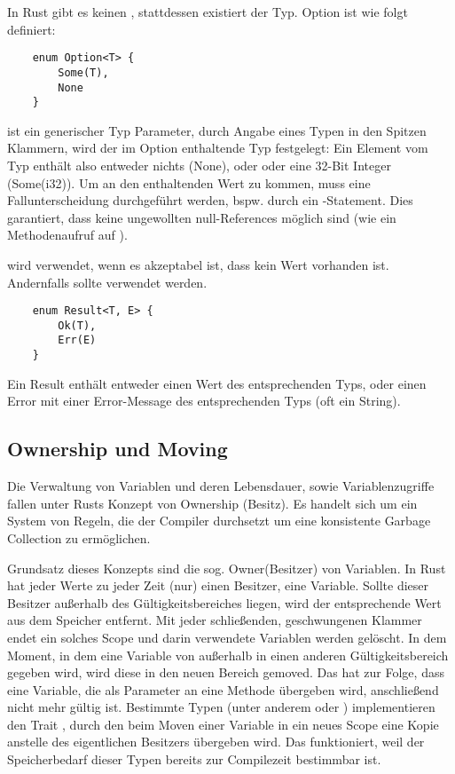 In Rust gibt es keinen , stattdessen existiert der  Typ. Option ist wie folgt definiert:

\begin{verbatim}
    enum Option<T> {
        Some(T),
        None
    }
\end{verbatim}

 ist ein generischer Typ Parameter, durch Angabe eines Typen in den Spitzen Klammern, wird der im Option enthaltende Typ festgelegt:
Ein Element vom Typ  enthält also entweder nichts (None), oder oder eine 32-Bit Integer (Some(i32)). Um an den enthaltenden Wert zu kommen, muss eine Fallunterscheidung durchgeführt werden, bspw. durch ein -Statement. Dies garantiert, dass keine ungewollten null-References möglich sind (wie \zB ein Methodenaufruf auf ).

 wird verwendet, wenn es akzeptabel ist, dass kein Wert vorhanden ist. Andernfalls sollte  verwendet werden.

\begin{verbatim}
    enum Result<T, E> {
        Ok(T),
        Err(E)
    }
\end{verbatim}

Ein Result enthält entweder einen Wert des entsprechenden Typs, oder einen Error mit einer Error-Message des entsprechenden Typs (oft ein String).

\subsection{Ownership und Moving}

Die Verwaltung von Variablen und deren Lebensdauer, sowie Variablenzugriffe fallen unter Rusts Konzept von \glqq Ownership\grqq{} (Besitz). Es handelt sich um ein System von Regeln, die der Compiler durchsetzt um eine konsistente Garbage Collection zu ermöglichen.

Grundsatz dieses Konzepts sind die sog. \glqq Owner\grqq (Besitzer) von Variablen. In Rust hat jeder Werte zu jeder Zeit (nur) einen Besitzer, eine Variable. Sollte dieser Besitzer außerhalb des Gültigkeitsbereiches liegen, wird der entsprechende Wert aus dem Speicher entfernt. Mit jeder schließenden, geschwungenen Klammer endet ein solches Scope und darin verwendete Variablen werden gelöscht. In dem Moment, in dem eine Variable von außerhalb in einen anderen Gültigkeitsbereich gegeben wird, wird diese in den neuen Bereich \glqq gemoved\grqq. Das hat zur Folge, dass eine Variable, die als Parameter an eine Methode übergeben wird, anschließend nicht mehr gültig ist. Bestimmte Typen (unter anderem  oder ) implementieren den Trait , durch den beim Moven einer Variable in ein neues Scope eine Kopie anstelle des eigentlichen Besitzers übergeben wird. Das funktioniert, weil der Speicherbedarf dieser Typen bereits zur Compilezeit bestimmbar ist.

